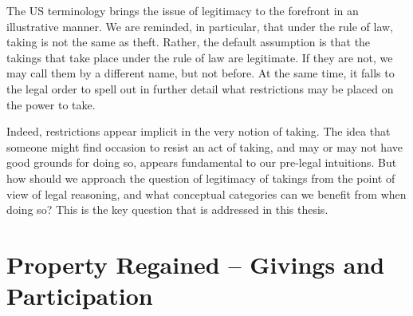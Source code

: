 The US terminology brings the issue of legitimacy to the forefront in an illustrative manner. We are reminded, in particular, that under the rule of law, taking is not the same as theft. Rather, the default assumption is that the takings that take place under the rule of law are legitimate. If they are not, we may call them by a different name, but not before. At the same time, it falls to the legal order to spell out in further detail what restrictions may be placed on the power to take. 

Indeed, restrictions appear implicit in the very notion of taking. The idea that someone might find occasion to resist an act of taking, and may or may not have good grounds for doing so, appears fundamental to our pre-legal intuitions. But how should we approach the question of legitimacy of takings from the point of view of legal reasoning, and what conceptual categories can we benefit from when doing so? This is the key question that is addressed in this thesis.

\section{Property Regained -- Givings and Participation}

